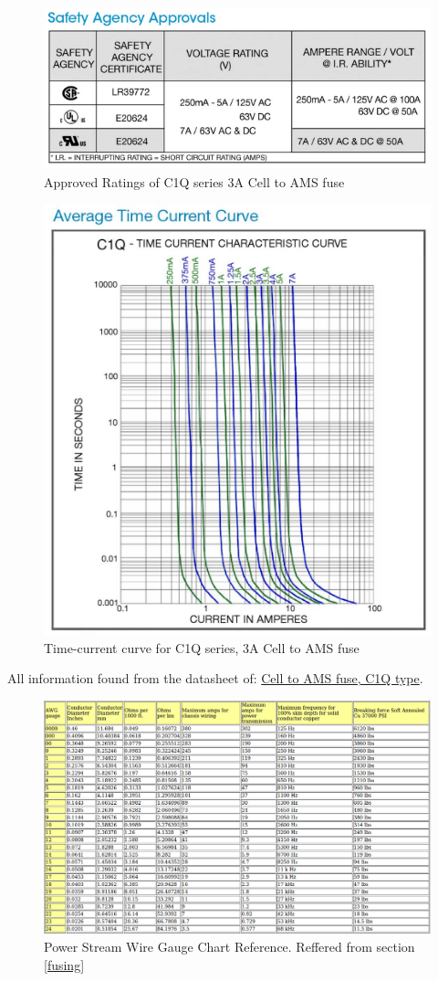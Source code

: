 \documentclass{article}
\begin{document}
\begin{figure}[H]
    \centering
    \includegraphics[width = 0.6 \textwidth]{amsfuseapprovals}
    \caption{Approved Ratings of C1Q series 3A Cell to AMS fuse}
    \label{amsfuseapproval}
\end{figure}

\begin{figure}[H]
    \centering
    \includegraphics[width = 0.6 \textwidth]{amsfusecurve}
    \caption{Time-current curve for C1Q series, 3A Cell to AMS fuse}
    \label{amsfusecurve}
\end{figure}

All information found from the datasheet of:
\href{http://belfuse.com/pdfs/C1Q.pdf}{Cell to AMS fuse, C1Q type}.

\begin{figure}
    \centering
    \includegraphics[width = 1 \textwidth]{WireGaugeChart}
    \caption{Power Stream Wire Gauge Chart Reference. Reffered from section \ref{fusing}}
    \label{AWGchart}
\end{figure}
\end{document}
